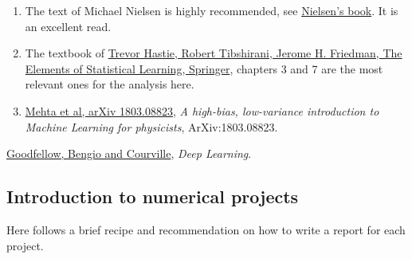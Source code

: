 \documentclass[%
oneside,                 %
final,                   %
10pt]{article}
\begin{document}
\begin{enumerate}
\item The text of Michael Nielsen is highly recommended, see \href{{http://neuralnetworksanddeeplearning.com/}}{Nielsen's book}. It is an excellent read.

\item The textbook of \href{{https://www.springer.com/gp/book/9780387848570}}{Trevor Hastie, Robert Tibshirani, Jerome H. Friedman, The Elements of Statistical Learning, Springer}, chapters 3 and 7 are the most relevant ones for the analysis here. 

\item \href{{https://arxiv.org/abs/1803.08823}}{Mehta et al, arXiv 1803.08823}, \emph{A high-bias, low-variance introduction to Machine Learning for physicists}, ArXiv:1803.08823.

\end{enumerate}

\noindent
\item \href{{https://www.deeplearningbook.org/}}{Goodfellow, Bengio and Courville}, \emph{Deep Learning}.

\subsection*{Introduction to numerical projects}

Here follows a brief recipe and recommendation on how to write a report for each
project.
\end{document}
